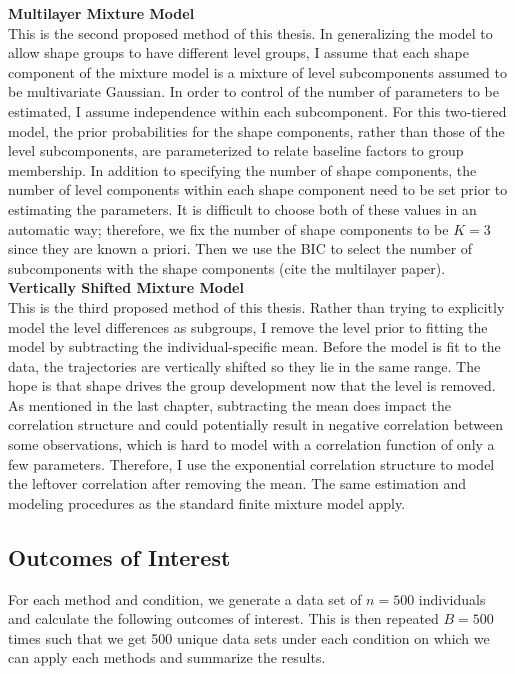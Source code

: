 \textbf{Multilayer Mixture Model}\\
This is the second proposed method of this thesis. In generalizing the model to allow shape groups to have different level groups, I assume that each shape component of the mixture model is a mixture of level subcomponents assumed to be multivariate Gaussian. In order to control of the number of parameters to be estimated, I assume independence within each subcomponent. For this two-tiered model, the prior probabilities for the shape components, rather than those of the level subcomponents, are parameterized to relate baseline factors to group membership. In addition to specifying the number of shape components, the number of level components within each shape component need to be set prior to estimating the parameters. It is difficult to choose both of these values in an automatic way; therefore, we fix the number of shape components to be $K=3$ since they are known a priori. Then we use the BIC to select the number of subcomponents with the shape components (cite the multilayer paper). \\

\textbf{Vertically Shifted Mixture Model}\\
This is the third proposed method of this thesis. Rather than trying to explicitly model the level differences as subgroups, I remove the level prior to fitting the model by subtracting the individual-specific mean. Before the model is fit to the data, the trajectories are vertically shifted so they lie in the same range. The hope is that shape drives the group development now that the level is removed. As mentioned in the last chapter, subtracting the mean does impact the correlation structure and could potentially result in negative correlation between some observations, which is hard to model with a correlation function of only a few parameters. Therefore, I use the exponential correlation structure to model the leftover correlation after removing the mean. The same estimation and modeling procedures as the standard finite mixture model apply.
\subsection{Outcomes of Interest}
For each method and condition, we generate a data set of $n=500$ individuals and calculate the following outcomes of interest. This is then repeated $B=500$ times such that we get 500 unique data sets under each condition on which we can apply each methods and summarize the results.\\

